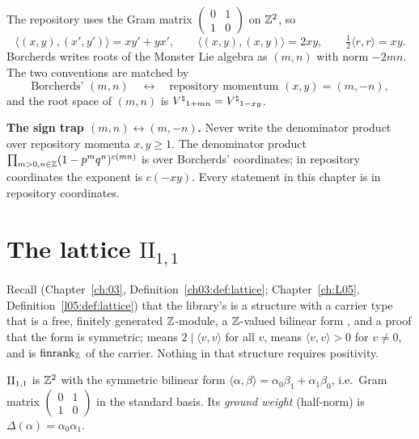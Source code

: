 The repository uses the Gram matrix $\left(\begin{smallmatrix}0&1\\1&0\end{smallmatrix}\right)$ on ${\mathbb{Z}}^2$, so
\begin{equation*}
  \langle(x,y),(x',y')\rangle = xy'+yx',\qquad \langle(x,y),(x,y)\rangle=2xy,\qquad
  \tfrac12\langle r,r\rangle = xy .
\end{equation*}
Borcherds writes roots of the Monster Lie algebra as $(m,n)$
with norm $-2mn$.  The two conventions are matched by
\begin{equation}\label{ch17:eq:signdict}
  \text{Borcherds' }(m,n)\quad\longleftrightarrow\quad\text{repository momentum }(x,y)=(m,-n),
\end{equation}
and the root space of $(m,n)$ is ${V^{\natural}}_{1+mn}={V^{\natural}}_{1-xy}$.

\begin{warning}
\textbf{The sign trap $(m,n)\leftrightarrow(m,-n)$.}  Never write the denominator product over repository momenta
$x,y\ge1$.  The denominator product $\prod_{m>0,n\in{\mathbb{Z}}}(1-p^mq^n)^{c(mn)}$ is
over Borcherds' coordinates; in repository coordinates the exponent is $c(-xy)$.  Every statement in this
chapter is in repository coordinates.
\end{warning}

\section{The lattice \texorpdfstring{$\mathrm{II}_{1,1}$}{II(1,1)}}\label{ch17:sec:lattice}

Recall (Chapter~\ref{ch:03}, Definition~\ref{ch03:def:lattice}; Chapter~\ref{ch:L05},
Definition~\ref{l05:def:lattice}) that the library's  is a structure with a carrier
type that is a free, finitely generated ${\mathbb{Z}}$-module, a ${\mathbb{Z}}$-valued bilinear form , and a proof
 that the form is symmetric;  means $2\mid\langle v,v\rangle$ for all $v$,
 means $\langle v,v\rangle>0$ for $v\ne0$, and  is $\operatorname{finrank}_{\mathbb{Z}}$ of the
carrier.  Nothing in that structure requires positivity.

\begin{definition}\label{ch17:def:lattice}
${\mathrm{II}_{1,1}}$ is ${\mathbb{Z}}^2$ with the symmetric bilinear form $\langle\alpha,\beta\rangle=\alpha_0\beta_1+\alpha_1\beta_0$, i.e.\ Gram
matrix $\left(\begin{smallmatrix}0&1\\1&0\end{smallmatrix}\right)$ in the standard basis.  Its \emph{ground weight}
(half-norm) is $\Delta(\alpha)=\alpha_0\alpha_1$.
\end{definition}

